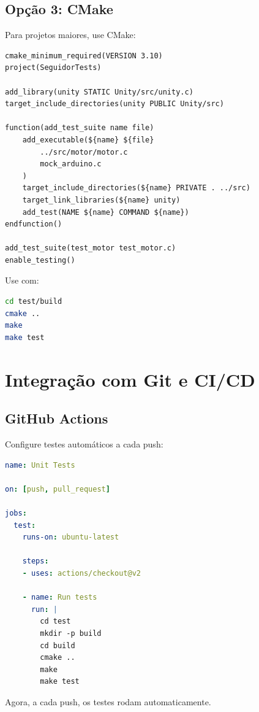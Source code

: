 \documentclass[12pt,a4paper]{article}
\begin{document}
\subsection{Opção 3: CMake}

Para projetos maiores, use CMake:

\begin{lstlisting}[caption=CMakeLists.txt]
cmake_minimum_required(VERSION 3.10)
project(SeguidorTests)

add_library(unity STATIC Unity/src/unity.c)
target_include_directories(unity PUBLIC Unity/src)

function(add_test_suite name file)
    add_executable(${name} ${file} 
        ../src/motor/motor.c
        mock_arduino.c
    )
    target_include_directories(${name} PRIVATE . ../src)
    target_link_libraries(${name} unity)
    add_test(NAME ${name} COMMAND ${name})
endfunction()

add_test_suite(test_motor test_motor.c)
enable_testing()
\end{lstlisting}

Use com:
\begin{lstlisting}[language=bash]
cd test/build
cmake ..
make
make test
\end{lstlisting}

\section{Integração com Git e CI/CD}

\subsection{GitHub Actions}

Configure testes automáticos a cada push:

\begin{lstlisting}[language=yaml, caption=.github/workflows/tests.yml]
name: Unit Tests

on: [push, pull_request]

jobs:
  test:
    runs-on: ubuntu-latest
    
    steps:
    - uses: actions/checkout@v2
    
    - name: Run tests
      run: |
        cd test
        mkdir -p build
        cd build
        cmake ..
        make
        make test
\end{lstlisting}

Agora, a cada push, os testes rodam automaticamente.
\end{document}

